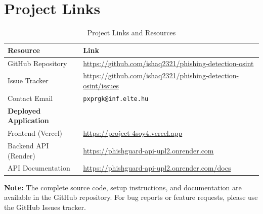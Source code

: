 \chapter*{Project Links}
\label{project-links}

\begin{table}[h]
\centering
\small
\caption{Project Links and Resources}
\label{tab:project-links}
\begin{tabular}{@{}>{\raggedright\arraybackslash}p{}>{\raggedright\arraybackslash}p{}@{}}
\toprule
\textbf{Resource} & \textbf{Link} \\
\midrule
GitHub Repository & \url{https://github.com/ishaq2321/phishing-detection-osint} \\
Issue Tracker & \url{https://github.com/ishaq2321/phishing-detection-osint/issues} \\
Contact Email & \texttt{pxprgk@inf.elte.hu} \\
\midrule
\textbf{Deployed Application} & \\
Frontend (Vercel) & \url{https://project-4soy4.vercel.app} \\
Backend API (Render) & \url{https://phishguard-api-upl2.onrender.com} \\
API Documentation & \url{https://phishguard-api-upl2.onrender.com/docs} \\
\bottomrule
\end{tabular}
\end{table}

\noindent\textbf{Note:} The complete source code, setup instructions, and documentation are available in the GitHub repository. For bug reports or feature requests, please use the GitHub Issues tracker.
